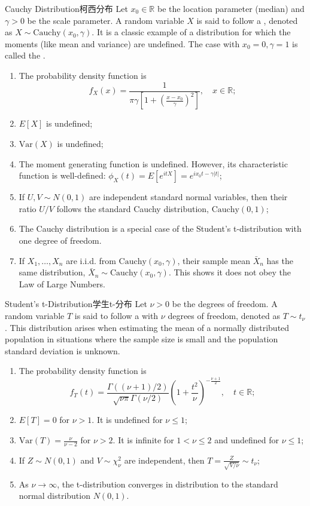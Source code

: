 \documentclass[../main.tex]{subfiles}
\begin{document}
\begin{proposition}{Cauchy Distribution}{柯西分布}
Let $x_0 \in \mathbb{R}$ be the location parameter (median) and $\gamma > 0$ be the scale parameter. A random variable $X$ is said to follow a , denoted as $X \sim \text{Cauchy}(x_0, \gamma)$. It is a classic example of a distribution for which the moments (like mean and variance) are undefined. The case with $x_0=0, \gamma=1$ is called the .
\begin{enumerate}
\item The probability density function is
$$f_X(x) = \frac{1}{\pi\gamma \left[1 + \left(\frac{x-x_0}{\gamma}\right)^2\right]}, \quad x \in \mathbb{R};$$
\item $E[X]$ is undefined;
\item $\text{Var}(X)$ is undefined;
\item The moment generating function is undefined. However, its characteristic function is well-defined: $\phi_X(t) = E[e^{itX}] = e^{ix_0 t - \gamma|t|}$;
\item If $U, V \sim N(0,1)$ are independent standard normal variables, then their ratio $U/V$ follows the standard Cauchy distribution, $\text{Cauchy}(0,1)$;
\item The Cauchy distribution is a special case of the Student's t-distribution with one degree of freedom.
\item If $X_1, \ldots, X_n$ are i.i.d. from $\text{Cauchy}(x_0, \gamma)$, their sample mean $\bar{X}_n$ has the same distribution, $\bar{X}_n \sim \text{Cauchy}(x_0, \gamma)$. This shows it does not obey the Law of Large Numbers.
\end{enumerate}
\end{proposition}
\begin{proposition}{Student's t-Distribution}{学生t-分布}
Let $\nu > 0$ be the degrees of freedom. A random variable $T$ is said to follow a  with $\nu$ degrees of freedom, denoted as $T \sim t_\nu$. This distribution arises when estimating the mean of a normally distributed population in situations where the sample size is small and the population standard deviation is unknown.
\begin{enumerate}
\item The probability density function is
$$f_T(t) = \frac{\Gamma((\nu+1)/2)}{\sqrt{\nu\pi}\Gamma(\nu/2)} \left(1 + \frac{t^2}{\nu}\right)^{-\frac{\nu+1}{2}}, \quad t \in \mathbb{R};$$
\item $E[T] = 0$ for $\nu > 1$. It is undefined for $\nu \le 1$;
\item $\text{Var}(T) = \frac{\nu}{\nu-2}$ for $\nu > 2$. It is infinite for $1 < \nu \le 2$ and undefined for $\nu \le 1$;
\item If $Z \sim N(0,1)$ and $V \sim \chi^2_\nu$ are independent, then $T = \frac{Z}{\sqrt{V/\nu}} \sim t_\nu$;
\item As $\nu \to \infty$, the t-distribution converges in distribution to the standard normal distribution $N(0,1)$.
\end{enumerate}
\end{proposition}
\end{document}
